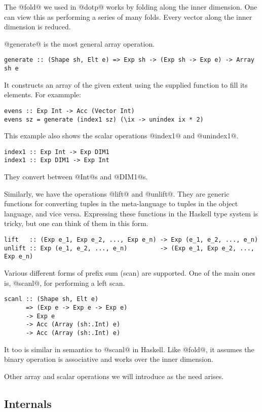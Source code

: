 The @fold@ we used in @dotp@ works by folding along the inner dimension. One can view this as performing a series of many folds. Every vector along the inner dimension is reduced.

@generate@ is the most general array operation.
%
\begin{lstlisting}
generate :: (Shape sh, Elt e) => Exp sh -> (Exp sh -> Exp e) -> Array sh e
\end{lstlisting}
%
It constructs an array of the given extent using the supplied function to fill its elements. For exammple:
%
\begin{lstlisting}
evens :: Exp Int -> Acc (Vector Int)
evens sz = generate (index1 sz) (\ix -> unindex ix * 2)
\end{lstlisting}
%
This example also shows the scalar operations @index1@ and @unindex1@.
%
\begin{lstlisting}
index1 :: Exp Int -> Exp DIM1
index1 :: Exp DIM1 -> Exp Int
\end{lstlisting}
%
They convert between @Int@s and @DIM1@s.

Similarly, we have the operations @lift@ and @unlift@. They are generic functions for converting tuples in the meta-language to tuples in the object language, and vice versa. Expressing these functions in the Haskell type system is tricky, but one can think of them in this form.
%
\begin{lstlisting}[style=ndp]
lift   :: (Exp e_1, Exp e_2, ..., Exp e_n) -> Exp (e_1, e_2, ..., e_n)
unlift :: Exp (e_1, e_2, ..., e_n)         -> (Exp e_1, Exp e_2, ..., Exp e_n)
\end{lstlisting}
%

Various different forms of prefix sum (scan) are supported. One of the main ones is, @scanl@, for performing a left scan.
%
\begin{lstlisting}
scanl :: (Shape sh, Elt e)
      => (Exp e -> Exp e -> Exp e)
      -> Exp e
      -> Acc (Array (sh:.Int) e)
      -> Acc (Array (sh:.Int) e)
\end{lstlisting}
%
It too is similar in semantics to @scanl@ in Haskell. Like @fold@, it assumes the binary operation is associative and works over the inner dimension.

Other array and scalar operations we will introduce as the need arises.


\subsection{Internals}
\label{sec:acc-internals}

